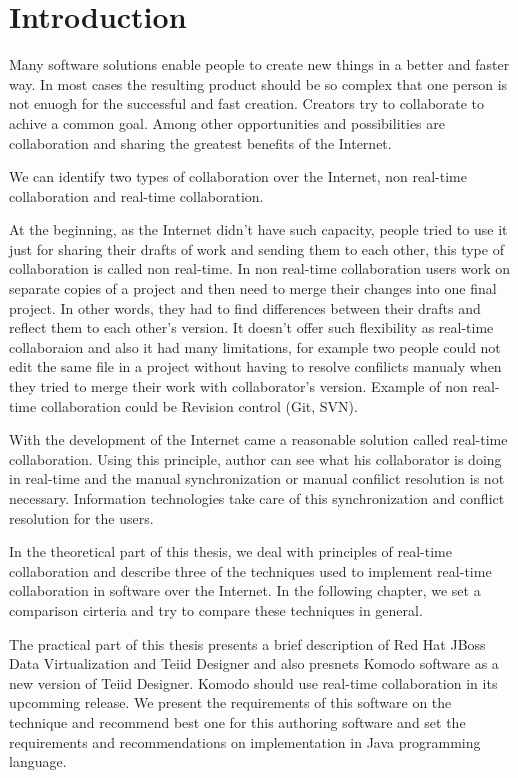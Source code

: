 \documentclass[12pt,oneside]{fithesis2}
\begin{document}
\chapter{Introduction} 
Many software solutions enable people to create new things in a better and faster way. In most cases the resulting product should be so complex that one person is not enuogh for the successful and fast creation. Creators try to collaborate to achive a common goal. Among other opportunities and possibilities are collaboration and sharing the greatest benefits of the Internet. \par
We can identify two types of collaboration over the Internet, non real-time collaboration and real-time collaboration. 
\par At the beginning, as the Internet didn't have such capacity, people tried to use it just for sharing their drafts of work and sending them to each other, this type of collaboration is called non real-time. In non real-time collaboration users work on separate copies of a project and then need to merge their changes into one final project. In other words, they had to find differences between their drafts and reflect them to each other's version. It doesn't offer such flexibility as real-time collaboraion and also it had many limitations, for example two people could not edit the same file in a project without having to resolve confilicts manualy when they tried to merge their work with collaborator's version. Example of non real-time collaboration could be Revision control (Git, SVN).\par
With the development of the Internet came a reasonable solution called real-time collaboration. Using this principle, author can see what his collaborator is doing in real-time and the manual synchronization or manual confilict resolution is not necessary. Information technologies take care of this synchronization and conflict resolution for the users.
\par In the theoretical part of this thesis, we deal with principles of real-time collaboration and describe three of the techniques used to implement real-time collaboration in software over the Internet. In the following chapter, we set a comparison cirteria and try to compare these techniques in general. 
\par The practical part of this thesis presents a brief description of Red Hat JBoss Data Virtualization and Teiid Designer and also presnets Komodo software as a new version of Teiid Designer. Komodo should use real-time collaboration in its upcomming release. We present the requirements of this software on the technique and recommend best one for this authoring software and set the requirements and recommendations on implementation in Java programming language.
\end{document}
